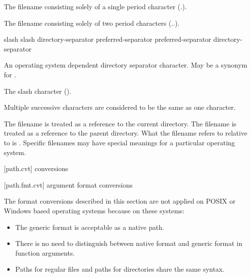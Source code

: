 \begin{ncbnf}
\br
    \textnormal{The filename consisting solely of a single period character (.).}
\end{ncbnf}

\begin{ncbnf}
\br
    \textnormal{The filename consisting solely of two period characters (..).}
\end{ncbnf}

\begin{ncbnf}
\br
    slash\br
    slash directory-separator\br
    preferred-separator\br
    preferred-separator directory-separator
\end{ncbnf}

\begin{ncbnf}
\br
    \textnormal{An operating system dependent directory separator character. May be a synonym for .}
\end{ncbnf}

\begin{ncbnf}
\br
    \textnormal{The slash character (\tcode{/}).}
\end{ncbnf}

\pnum
Multiple successive  characters are considered to
be the same as one  character.

\pnum
The filename  is treated as a reference to the current directory.
The filename  is treated as a reference to the parent directory.
What the filename  refers to
relative to  is .
Specific filenames may have special meanings for a particular operating system.

[path.cvt]{ conversions}

[path.fmt.cvt]{ argument format conversions}

\pnum
\enternote
The format conversions described in this section
are not applied on POSIX or Windows based operating systems
because on these systems:
\begin{itemize}
\item The generic format is acceptable as a native path.
\item There is no need to distinguish between native format and generic format in function arguments.
\item Paths for regular files and paths for directories share the same syntax.
\end{itemize}
\exitnote

